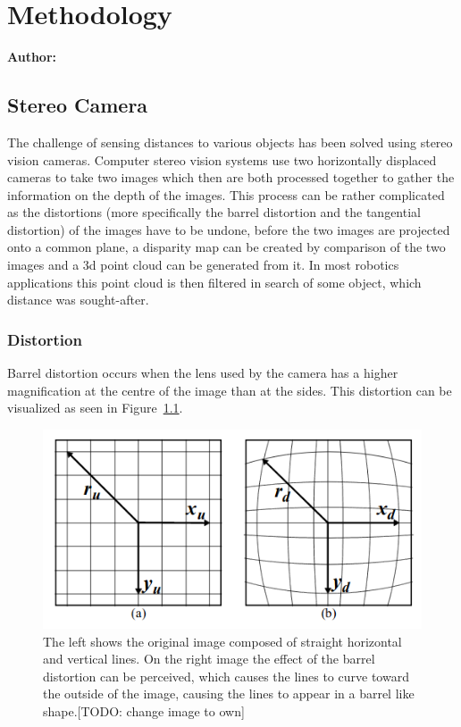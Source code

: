 \chapter{Methodology}

\textbf{Author: } 

\section{Stereo Camera}
The challenge of sensing distances to various objects has been solved using stereo vision cameras. Computer stereo vision systems use two horizontally displaced cameras to take two images which then are both processed together to gather the information on the depth of the images. This process can be rather complicated as the distortions (more specifically the barrel distortion and the tangential distortion) of the images have to be undone, before the two images are projected onto a common plane, a disparity map can be created by comparison of the two images and a 3d point cloud can be generated from it. In most robotics applications this point cloud is then filtered in search of some object, which distance was sought-after.

\subsection{Distortion}
Barrel distortion occurs when the lens used by the camera has a higher magnification at the centre of the image than at the sides. This distortion can be visualized as seen in Figure~\ref{pic:methodology_stereoCamera_distortion_barrelDistortion}.

\begin{figure}[h!]
	\centering
	\includegraphics[width=4.5in]{img/methodology_stereoCamera_distortion_barrelDistortion.png}
	\caption{The left shows the original image composed of straight horizontal and vertical lines. On the right image the effect of the barrel distortion can be perceived, which causes the lines to curve toward the outside of the image, causing the lines to appear in a barrel like shape.[TODO: change image to own]}
	\label{pic:methodology_stereoCamera_distortion_barrelDistortion}
\end{figure}

